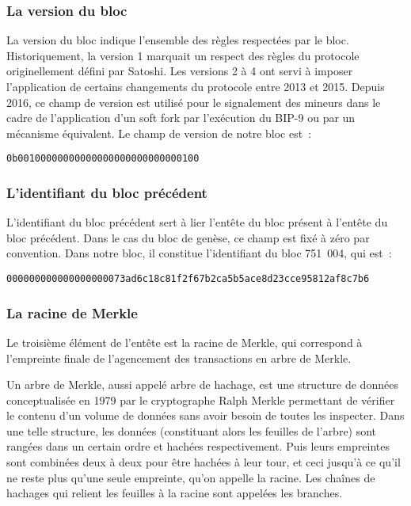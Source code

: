 
\subsubsection*{La version du bloc} La version du bloc indique l'ensemble des règles respectées par le bloc. Historiquement, la version 1 marquait un respect des règles du protocole originellement défini par Satoshi. Les versions 2 à 4 ont servi à imposer l'application de certains changements du protocole entre 2013 et 2015. Depuis 2016, ce champ de version est utilisé pour le signalement des mineurs dans le cadre de l'application d'un soft fork par l'exécution du BIP-9 ou par un mécanisme équivalent. Le champ de version de notre bloc est~:

\begin{Verbatim}[fontsize=\footnotesize]
0b00100000000000000000000000000100
\end{Verbatim}


\subsubsection*{L'identifiant du bloc précédent} L'identifiant du bloc précédent sert à lier l'entête du bloc présent à l'entête du bloc précédent. Dans le cas du bloc de genèse, ce champ est fixé à zéro par convention. Dans notre bloc, il constitue l'identifiant du bloc 751~004, qui est~:

\begin{Verbatim}[fontsize=\footnotesize]
000000000000000000073ad6c18c81f2f67b2ca5b5ace8d23cce95812af8c7b6
\end{Verbatim}


\subsubsection*{La racine de Merkle} Le troisième élément de l'entête est la racine de Merkle, qui correspond à l'empreinte finale de l'agencement des transactions en arbre de Merkle.

Un arbre de Merkle, aussi appelé arbre de hachage, est une structure de données conceptualisée en 1979 par le cryptographe Ralph Merkle permettant de vérifier le contenu d'un volume de données sans avoir besoin de toutes les inspecter. Dans une telle structure, les données (constituant alors les feuilles de l'arbre) sont rangées dans un certain ordre et hachées respectivement. Puis leurs empreintes sont combinées deux à deux pour être hachées à leur tour, et ceci jusqu'à ce qu'il ne reste plus qu'une seule empreinte, qu'on appelle la racine. Les chaînes de hachages qui relient les feuilles à la racine sont appelées les branches.

